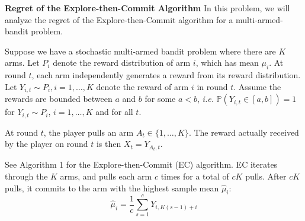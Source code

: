\documentclass[12pt, addpoints]{exam}
\begin{document}
\begin{questions}


\question[40] \textbf{Regret of the Explore-then-Commit Algorithm}
In this problem, we will analyze the regret of the Explore-then-Commit algorithm for a multi-armed-bandit problem. 

Suppose we have a stochastic multi-armed bandit problem where there are $K$ arms. Let $P_i$ denote the reward distribution of arm $i$, which has mean $\mu_i$. At round $t$, each arm independently generates a reward from its reward distribution. Let $Y_{i,t} \sim P_i , i = 1, \ldots, K$ denote the reward of arm $i$ in round $t$. Assume the rewards are bounded between $a$ and $b$ for some $a < b$, \textit{i.e.} $\mathbb{P}(Y_{i, t}\in [a, b]) = 1$ for $Y_{i, t}\sim P_i$, $i =1, \ldots, K$ and for all $t$.

At round $t$, the player pulls an arm $A_t \in \{1,\ldots,K\}$. The reward actually received by the player on round $t$ is then $X_t = Y_{{A_t},t}$.

See Algorithm 1 for the Explore-then-Commit (EC) algorithm.
EC iterates through the $K$ arms, and pulls each arm $c$ times for a total of $cK$ pulls. After $cK$ pulls, it commits to the arm with the highest sample mean $\hat \mu_i$:
\[ \hat \mu_i = \frac{1}{c}\sum_{s=1}^c Y_{i, K(s - 1) + i}\]


\end{questions}
\end{document}
